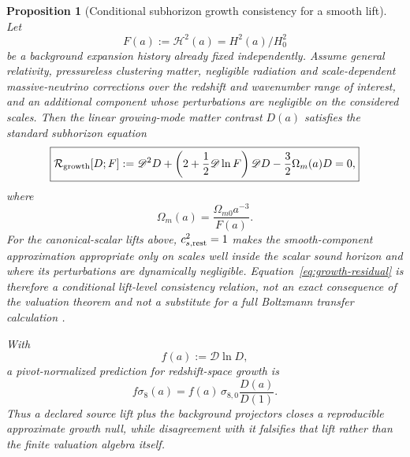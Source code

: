 \documentclass[aps,prd,preprint,onecolumn,nofootinbib,superscriptaddress,showkeys]{revtex4-2}
\numberwithin{equation}{section}
\theoremstyle{definition}
\theoremstyle{plain}
\newtheorem{proposition}{Proposition}[section]
\newcommand{\Dil}{\mathscr D}
\begin{document}
\begin{proposition}[Conditional subhorizon growth consistency for a smooth lift]\label{prop:growth-null}
Let
\[
F(a):=\mathcal H^2(a)=H^2(a)/H_0^2
\]
be a background expansion history already fixed independently.  Assume general relativity, pressureless clustering matter, negligible radiation and scale-dependent massive-neutrino corrections over the redshift and wavenumber range of interest, and an additional component whose perturbations are negligible on the considered scales.  Then the linear growing-mode matter contrast $D(a)$ satisfies the standard subhorizon equation
\begin{equation}
\boxed{
\mathcal R_{\rm growth}[D;F]
:=
\Dil^2D+
\left(2+\frac12\Dil\ln F\right)\Dil D
-\frac32\Omega_m(a)D
=0,
}
\label{eq:growth-residual}
\end{equation}
where
\begin{equation}
\Omega_m(a)=\frac{\Omega_{m0}a^{-3}}{F(a)}.
\end{equation}
For the canonical-scalar lifts above, $c_{s,\rm rest}^2=1$ makes the smooth-component approximation appropriate only on scales well inside the scalar sound horizon and where its perturbations are dynamically negligible.  Equation~\eqref{eq:growth-residual} is therefore a conditional lift-level consistency relation, not an exact consequence of the valuation theorem and not a substitute for a full Boltzmann transfer calculation \cite{Linder2005}.

With
\[
f(a):=\Dil\ln D,
\]
a pivot-normalized prediction for redshift-space growth is
\begin{equation}
f\sigma_8(a)
 =f(a)\,\sigma_{8,0}\frac{D(a)}{D(1)}.
\end{equation}
Thus a declared source lift plus the background projectors closes a reproducible approximate growth null, while disagreement with it falsifies that lift rather than the finite valuation algebra itself.
\end{proposition}
\end{document}
